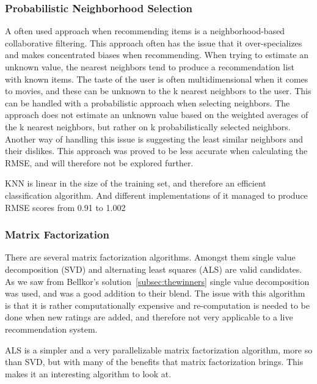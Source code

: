 \subsubsection{Probabilistic Neighborhood Selection}
A often used approach when recommending items is a neighborhood-based collaborative filtering. This approach often has the issue that it over-specializes and makes concentrated biases when recommending. When trying to estimate an unknown value, the nearest neighbors tend to produce a recommendation list with known items. The taste of the user is often multidimensional when it comes to movies, and these can be unknown to the k nearest neighbors to the user\cite{umana}. This can be handled with a probabilistic approach when selecting neighbors\cite{probcobfilter}. The approach does not estimate an unknown value based on the weighted averages of the k nearest neighbors, but rather on k probabilistically selected neighbors\cite{optaplanner}. Another way of handling this issue is suggesting the least similar neighbors and their dislikes\cite{furthestneighbor}. This approach was proved to be less accurate when calculating the RMSE\cite{probcobfilter}, and will therefore not be explored further.

KNN is linear in the size of the training set, and therefore an efficient classification algorithm\cite{introtoIR}. And different implementations of it managed to produce RMSE scores from 0.91 to 1.002~\cite{knnnetflixstand, knnoldies, knnimpl, knncolbgroup}


\subsubsection{Matrix Factorization}\label{subsubsec:matrixfac}
There are several matrix factorization algorithms. Amongst them single value decomposition (SVD) and alternating least squares (ALS) are valid candidates. As we saw from Bellkor's solution~\ref{subsec:thewinners} single value decomposition was used, and was a good addition to their blend. The issue with this algorithm is that it is rather computationally expensive and re-computation is needed to be done when new ratings are added, and therefore not very applicable to a live recommendation system.

ALS is a simpler and a very parallelizable matrix factorization algorithm, more so than SVD, but with many of the benefits that matrix factorization brings\cite{predusingmatrix}. This makes it an interesting algorithm to look at.

